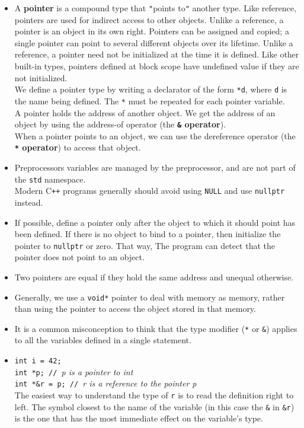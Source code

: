 \begin{itemize}
\item
A \textbf{pointer} is a compound type that \texttt{"}points to\texttt{"} another type. Like reference, pointers are used for indirect access to other objects. Unlike a reference, a pointer is an object in its own right. Pointers can be assigned and copied; a single pointer can point to several different objects over its lifetime. Unlike a reference, a pointer need not be initialized at the time it is defined. Like other built-in types, pointers defined at block scope have undefined value if they are not initialized.\\
We define a pointer type by writing a declarator of the form \texttt{*d}, where \texttt{d} is the name being defined. The \texttt{*} must be repeated for each pointer variable.\\
A pointer holds the address of another object. We get the address of an object by using the address-of operator (the \textbf{\texttt{\&} operator}).
\\When a pointer points to an object, we can use the dereference operator (the \textbf{\texttt{*} operator}) to access that object.

\item
Preprocessors variables are managed by the preprocessor, and are not part of the \texttt{std} namespace.\\
Modern C\texttt{++} programs generally should avoid using \texttt{NULL} and use \texttt{nullptr} instead.

\item
If possible, define a pointer only after the object to which it should point has been defined. If there is no object to bind to a pointer, then initialize the pointer to \texttt{nullptr} or zero. That way, The program can detect that the pointer does not point to an object.

\item
Two pointers are equal if they hold the same address and unequal otherwise.

\item
Generally, we use a \texttt{void*} pointer to deal with memory as memory, rather than using the pointer to access the object stored in that memory.

\item
It is a common misconception to think that the type modifier (\texttt{*} or \texttt{\&}) applies to all the variables defined in a single statement.

\item
\hspace*{1em}\texttt{int i = 42;}\\
\hspace*{1em}\texttt{int *p; // }\textit{p is a pointer to int}\\
\hspace*{1em}\texttt{int *\&r = p; // }\textit{r is a reference to the pointer p}\\
The easiest way to understand the type of \texttt{r} is to read the definition right to left. The symbol closest to the name of the variable (in this case the \texttt{\&} in \texttt{\&r}) is the one that has the most immediate effect on the variable's type.


\end{itemize}
